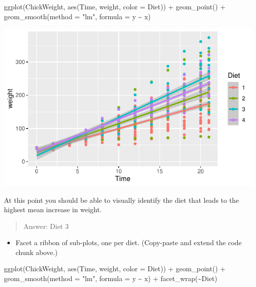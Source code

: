 \documentclass[
  letterpaper,
  DIV=11,
  numbers=noendperiod]{scrartcl}
\newenvironment{Shaded}{\begin{snugshade}}{\end{snugshade}}
\newcommand{\AttributeTok}[1]{\textcolor[rgb]{0.40,0.45,0.13}{#1}}
\newcommand{\FunctionTok}[1]{\textcolor[rgb]{0.28,0.35,0.67}{#1}}
\newcommand{\NormalTok}[1]{\textcolor[rgb]{0.00,0.23,0.31}{#1}}
\newcommand{\SpecialCharTok}[1]{\textcolor[rgb]{0.37,0.37,0.37}{#1}}
\newcommand{\StringTok}[1]{\textcolor[rgb]{0.13,0.47,0.30}{#1}}
\providecommand{\tightlist}{%
  \setlength{\itemsep}{0pt}\setlength{\parskip}{0pt}}\usepackage{longtable,booktabs,array}
\begin{document}
\begin{Shaded}
\begin{Highlighting}[]
\FunctionTok{ggplot}\NormalTok{(ChickWeight, }\FunctionTok{aes}\NormalTok{(Time, weight, }\AttributeTok{color =}\NormalTok{ Diet)) }\SpecialCharTok{+}
  \FunctionTok{geom\_point}\NormalTok{() }\SpecialCharTok{+}
  \FunctionTok{geom\_smooth}\NormalTok{(}\AttributeTok{method =} \StringTok{"lm"}\NormalTok{, }\AttributeTok{formula =}\NormalTok{ y }\SpecialCharTok{\textasciitilde{}}\NormalTok{ x)}
\end{Highlighting}
\end{Shaded}

\includegraphics{5-ggplot2_kevin_files/figure-pdf/unnamed-chunk-13-1.pdf}

At this point you should be able to visually identify the diet that
leads to the highest mean increase in weight.

\begin{quote}
Answer: Diet 3
\end{quote}

\begin{itemize}
\tightlist
\item
  Facet a ribbon of sub-plots, one per diet. (Copy-paste and extend the
  code chunk above.)
\end{itemize}

\begin{Shaded}
\begin{Highlighting}[]
\FunctionTok{ggplot}\NormalTok{(ChickWeight, }\FunctionTok{aes}\NormalTok{(Time, weight, }\AttributeTok{color =}\NormalTok{ Diet)) }\SpecialCharTok{+}
  \FunctionTok{geom\_point}\NormalTok{() }\SpecialCharTok{+}
  \FunctionTok{geom\_smooth}\NormalTok{(}\AttributeTok{method =} \StringTok{"lm"}\NormalTok{, }\AttributeTok{formula =}\NormalTok{ y }\SpecialCharTok{\textasciitilde{}}\NormalTok{ x) }\SpecialCharTok{+}
  \FunctionTok{facet\_wrap}\NormalTok{(}\SpecialCharTok{\textasciitilde{}}\NormalTok{Diet)}
\end{Highlighting}
\end{Shaded}
\end{document}
